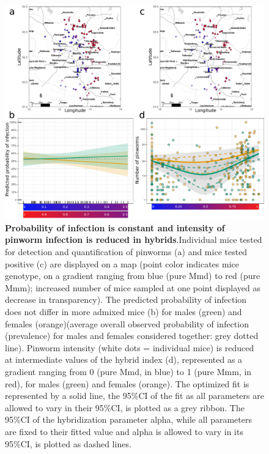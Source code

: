 \begin{figure}[H]
    \centering
    \includegraphics[width=\linewidth,height=\textheight,keepaspectratio]{images/2article1/Figure3.pdf}
    \caption{\textbf{Probability of infection is constant and intensity of pinworm infection is reduced in hybrids}.Individual mice tested for detection and quantification of pinworms (a) and mice tested positive (c) are displayed on a map (point color indicates mice genotype, on a gradient ranging from blue (pure Mmd) to red (pure Mmm); increased number of mice sampled at one point displayed as decrease in transparency). The predicted probability of infection does not differ in more admixed mice (b) for males (green) and females (orange)(average overall observed probability of infection (prevalence) for males and females considered together: grey dotted line). Pinworm intensity (white dots = individual mice) is reduced at intermediate values of the hybrid index (d), represented as a gradient ranging from 0 (pure Mmd, in blue) to 1 (pure Mmm, in red), for males (green) and females (orange). The optimized fit is represented by a solid line, the 95\%CI of the fit as all parameters are allowed to vary in their 95\%CI, is plotted as a grey ribbon. The 95\%CI of the hybridization parameter alpha, while all parameters are fixed to their fitted value and alpha is allowed to vary in its 95\%CI, is plotted as dashed lines.}
\end{figure}

